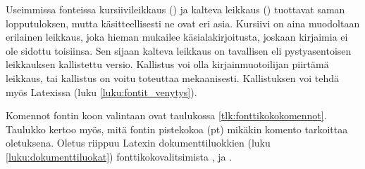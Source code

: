 Useimmissa fonteissa kursiivileikkaus () ja kalteva
leikkaus () tuottavat saman lopputuloksen, mutta
käsitteellisesti ne ovat eri asia. Kursiivi on aina muodoltaan erilainen
leikkaus, joka hieman mukailee käsialakirjoitusta, joskaan kirjaimia ei
ole sidottu toisiinsa. Sen sijaan kalteva leikkaus on tavallisen eli
pystyasentoisen leikkauksen kallistettu versio. Kallistus voi olla
kirjainmuotoilijan piirtämä leikkaus, tai kallistus on voitu toteuttaa
mekaanisesti. Kallistuksen voi tehdä myös Latexissa (luku
\ref{luku:fontit_venytys}).

Komennot fontin koon valintaan ovat taulukossa
\ref{tlk:fonttikokokomennot}. Taulukko kertoo myös, mitä fontin
pistekokoa (pt) mikäkin komento tarkoittaa oletuksena. Oletus riippuu
Latexin dokumenttiluokkien (luku \ref{luku:dokumenttiluokat})
fonttikokovalitsimista \koodi{10pt}, \koodi{11pt} ja \koodi{12pt}.


%

